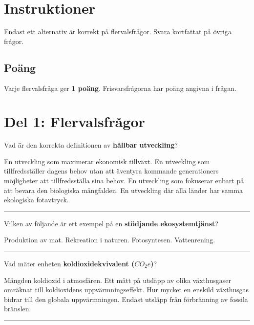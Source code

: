 \documentclass{exam}
\begin{document}
\section*{Instruktioner}
Endast ett alternativ är korrekt på flervalsfrågor. Svara kortfattat på övriga frågor.

\subsection*{Poäng}
Varje flervalsfråga ger \textbf{1 poäng}. Frisvarsfrågorna har poäng angivna i frågan.

\section*{Del 1: Flervalsfrågor}

\begin{questions}

\question Vad är den korrekta definitionen av \textbf{hållbar utveckling}?
\vspace{2mm}
\begin{checkboxes}
    \choice En utveckling som maximerar ekonomisk tillväxt.
    \choice En utveckling som tillfredsställer dagens behov utan att äventyra kommande generationers möjligheter att tillfredsställa sina behov.
    \choice En utveckling som fokuserar enbart på att bevara den biologiska mångfalden.
    \choice En utveckling där alla länder har samma ekologiska fotavtryck.
\end{checkboxes}
\vspace{5mm} \hrule \vspace{5mm}

\question Vilken av följande är ett exempel på en \textbf{stödjande ekosystemtjänst}?
\vspace{2mm}
\begin{checkboxes}
    \choice Produktion av mat.
    \choice Rekreation i naturen.
    \choice Fotosyntesen.
    \choice Vattenrening.
\end{checkboxes}
\vspace{5mm} \hrule \vspace{5mm}

\question Vad mäter enheten \textbf{koldioxidekvivalent ($CO_2e$)}?
\vspace{2mm}
\begin{checkboxes}
    \choice Mängden koldioxid i atmosfären.
    \choice Ett mått på utsläpp av olika växthusgaser omräknat till koldioxidens uppvärmningseffekt.
    \choice Hur mycket en enskild växthusgas bidrar till den globala uppvärmningen.
    \choice Endast utsläpp från förbränning av fossila bränslen.
\end{checkboxes}
\vspace{5mm} \hrule \vspace{5mm}


\end{questions}
\end{document}
